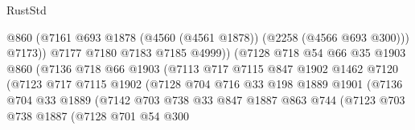 \begin{lexlean}{RustStd}
\begin{coremodule}
                                    @860
                                    (@7161
                                      @693
                                      @1878
                                      (@4560 (@4561 @1878))
                                      (@2258 (@4566 @693 @300)))
                                    @7173))
                                @7177
                                @7180
                                @7183
                                @7185
                                @4999))
                            (@7128
                              @718
                              @54
                              @66
                              @35
                              @1903
                              @860
                              (@7136
                                @718
                                @66
                                @1903
                                (@7113
                                  @717
                                  @7115
                                  @847
                                  @1902
                                  @1462
                                  @7120
                                  (@7123
                                    @717
                                    @7115
                                    @1902
                                    (@7128
                                      @704
                                      @716
                                      @33
                                      @198
                                      @1889
                                      @1901
                                      (@7136
                                        @704
                                        @33
                                        @1889
                                        (@7142
                                          @703
                                          @738
                                          @33
                                          @847
                                          @1887
                                          @863
                                          @744
                                          (@7123
                                            @703
                                            @738
                                            @1887
                                            (@7128
                                              @701
                                              @54
                                              @300

\end{coremodule}
\end{lexlean}
